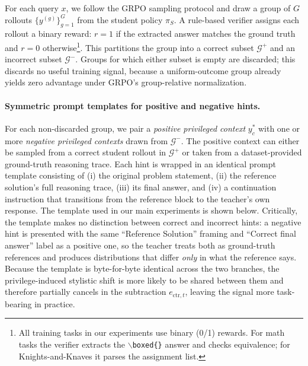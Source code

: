 For each query $x$, we follow the GRPO sampling protocol and draw a group of $G$ rollouts $\{y^{(g)}\}_{g=1}^G$ from the student policy $\pi_S$. A rule-based verifier assigns each rollout a binary reward: $r=1$ if the extracted answer matches the ground truth and $r=0$ otherwise\footnote{All training tasks in our experiments use binary (0/1) rewards. For math tasks the verifier extracts the $\backslash$\texttt{boxed\{\}} answer and checks equivalence; for Knights-and-Knaves it parses the assignment list.}. This partitions the group into a correct subset $\mathcal{G}^+$ and an incorrect subset $\mathcal{G}^-$. Groups for which either subset is empty are discarded; this discards no useful training signal, because a uniform-outcome group already yields zero advantage under GRPO's group-relative normalization.

\paragraph{Symmetric prompt templates for positive and negative hints.}
For each non-discarded group, we pair a \emph{positive privileged context} $y_c^*$ with one or more \emph{negative privileged contexts} drawn from $\mathcal{G}^-$. The positive context can either be sampled from a correct student rollout in $\mathcal{G}^+$ or taken from a dataset-provided ground-truth reasoning trace. Each hint is wrapped in an identical prompt template consisting of (i) the original problem statement, (ii) the reference solution's full reasoning trace, (iii) its final answer, and (iv) a continuation instruction that transitions from the reference block to the teacher's own response. The template used in our main experiments is shown below. Critically, the template makes no distinction between correct and incorrect hints: a negative hint is presented with the same ``Reference Solution'' framing and ``Correct final answer'' label as a positive one, so the teacher treats both as ground-truth references and produces distributions that differ \emph{only} in what the reference says. Because the template is byte-for-byte identical across the two branches, the privilege-induced stylistic shift is more likely to be shared between them and therefore partially cancels in the subtraction $e_{\text{ctr},t}$, leaving the signal more task-bearing in practice.

